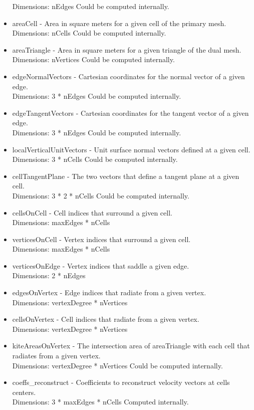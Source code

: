 \documentclass[11pt]{report}
\begin{document}
\begin{itemize}
		  Dimensions: nEdges
		  Could be computed internally. 
	\item areaCell - Area in square meters for a given cell of the primary mesh. \\
		  Dimensions: nCells
		  Could be computed internally. 
	\item areaTriangle - Area in square meters for a given triangle of the dual mesh. \\
		  Dimensions: nVertices
		  Could be computed internally. 
	\item edgeNormalVectors - Cartesian coordinates for the normal vector of a given edge. \\
		  Dimensions: 3 * nEdges
		  Could be computed internally. 
	\item edgeTangentVectors - Cartesian coordinates for the tangent vector of a given edge. \\
		  Dimensions: 3 * nEdges
		  Could be computed internally. 
	\item localVerticalUnitVectors - Unit surface normal vectors defined at a given cell. \\
		  Dimensions: 3 * nCells
		  Could be computed internally. 
	\item cellTangentPlane - The two vectors that define a tangent plane at a given cell. \\
		  Dimensions: 3 * 2 * nCells
		  Could be computed internally. 
	\item cellsOnCell - Cell indices that surround a given cell. \\
		  Dimensions: maxEdges * nCells
	\item verticesOnCell - Vertex indices that surround a given cell. \\
		  Dimensions: maxEdges * nCells
	\item verticesOnEdge - Vertex indices that saddle a given edge. \\
		  Dimensions: 2 * nEdges
	\item edgesOnVertex - Edge indices that radiate from a given vertex. \\
		  Dimensions: vertexDegree * nVertices
	\item cellsOnVertex - Cell indices that radiate from a given vertex. \\
		  Dimensions: vertexDegree * nVertices
	\item kiteAreasOnVertex - The intersection area of areaTriangle with each cell that radiates from a given vertex. \\
		  Dimensions: vertexDegree * nVertices
		  Could be computed internally. 
	\item coeffs\_reconstruct - Coefficients to reconstruct velocity vectors at cells centers. \\
		  Dimensions: 3 * maxEdges * nCells
		  Computed internally. 
\end{itemize}
\end{document}
